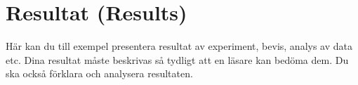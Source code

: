 \section{Resultat (Results)}

Här kan du till exempel presentera resultat av experiment, bevis, analys av data etc. Dina resultat måste beskrivas så tydligt att en läsare kan bedöma dem.  Du ska också förklara och analysera resultaten.


